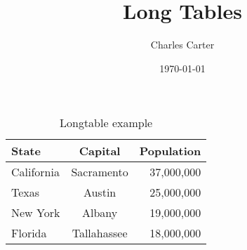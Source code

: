 \documentclass{article}
\title{Long Tables}
\author{Charles Carter}
\date{\today{}}
\begin{document}
 
    \maketitle{}
    \listoftables{}
        \begin{longtable}{| l | c | r | }
            \caption{Longtable example}
            \label{longtable}
            \hline
            State & Capital & Population \\
            \hline
            \hline
            California & Sacramento & 37,000,000 \\
            \hline
            Texas & Austin  & 25,000,000 \\
            \hline
            New York & Albany & 19,000,000 \\
            \hline
            Florida & Tallahassee  & 18,000,000 \\
            \hline
        \end{longtable}
\end{document}
